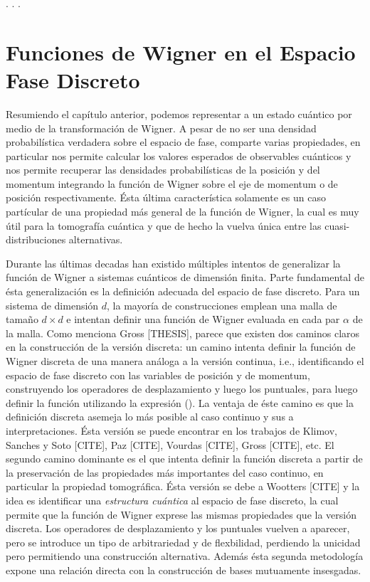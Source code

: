 \documentclass[a4paper]{report}
\begin{document}
  . . .

  \chapter{Funciones de Wigner en el Espacio Fase Discreto}

  Resumiendo el capítulo anterior, podemos representar a un
  estado cuántico por medio de la transformación de Wigner.
  A pesar de no ser una densidad probabilística verdadera
  sobre el espacio de fase, comparte varias propiedades, en
  particular nos permite calcular los valores esperados de
  observables cuánticos y nos permite recuperar las
  densidades probabilísticas de la posición y del momentum
  integrando la función de Wigner sobre el eje de momentum o
  de posición respectivamente. Ésta última característica
  solamente es un caso partícular de una propiedad más
  general de la función de Wigner, la cual es muy útil para
  la tomografía cuántica y que de hecho la vuelva única
  entre las cuasi-distribuciones alternativas.

  Durante las últimas decadas han existido múltiples
  intentos de generalizar la función de Wigner a sistemas
  cuánticos de dimensión finita. Parte fundamental de ésta
  generalización es la definición adecuada del espacio de
  fase discreto. Para un sistema de dimensión $d$, la
  mayoría de construcciones emplean una malla de tamaño $d
  \times d$ e intentan definir una función de Wigner
  evaluada en cada par $\alpha$ de la malla. Como menciona
  Gross [THESIS], parece que existen dos caminos claros en
  la construcción de la versión discreta: un camino intenta
  definir la función de Wigner discreta de una manera
  análoga a la versión continua, i.e., identificando el
  espacio de fase discreto con las variables de posición y
  de momentum, construyendo los operadores de desplazamiento
  y luego los puntuales, para luego definir la función
  utilizando la expresión (). La ventaja de éste camino es
  que la definición discreta asemeja lo más posible al caso
  continuo y sus a interpretaciones.  Ésta versión se puede
  encontrar en los trabajos de Klimov, Sanches y Soto
  [CITE], Paz [CITE], Vourdas [CITE], Gross [CITE], etc. El
  segundo camino dominante es el que intenta definir la
  función discreta a partir de la preservación de las
  propiedades más importantes del caso continuo, en
  particular la propiedad tomográfica. Ésta versión se debe
  a Wootters [CITE] y la idea es identificar una
  \textit{estructura cuántica} al espacio de fase discreto,
  la cual permite que la función de Wigner exprese las
  mismas propiedades que la versión discreta.  Los
  operadores de desplazamiento y los puntuales vuelven a
  aparecer, pero se introduce un tipo de arbitrariedad y de
  flexbilidad, perdiendo la unicidad pero permitiendo una
  construcción alternativa. Además ésta segunda metodología
  expone una relación directa con la construcción de bases
  mutuamente insesgadas.
\end{document}
